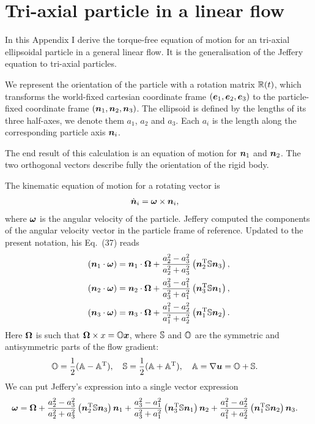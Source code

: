 \documentclass[thesis.tex]{subfiles}
\begin{document}
\chapter{Tri-axial particle in a linear flow}

In this Appendix I derive the torque-free equation of motion for an tri-axial ellipsoidal particle in a general linear flow. It is the generalisation of the Jeffery equation to tri-axial particles. 

We represent the orientation of the particle with a rotation matrix $\mathbb{R}(t)$, which transforms the world-fixed cartesian coordinate frame $(\mbox{\boldmath$e$}_1, \mbox{\boldmath$e$}_2, \mbox{\boldmath$e$}_3)$ to the particle-fixed coordinate frame $(\mbox{\boldmath$n$}_1, \mbox{\boldmath$n$}_2, \mbox{\boldmath$n$}_3)$. The ellipsoid is defined by the lengths of its three half-axes, we denote them $a_1$, $a_2$ and $a_3$. Each $a_i$ is the length along the corresponding particle axis $\mbox{\boldmath$n$}_i$.

The end result of this calculation is an equation of motion for $\mbox{\boldmath$n$}_1$ and $\mbox{\boldmath$n$}_2$. The two orthogonal vectors describe fully the orientation of the rigid body.

The kinematic equation of motion for a rotating vector is 
\begin{align}
	\dot{\ve n}_i &= \ve \omega \cross \ve n_i,\eqnlab{tri01}
\end{align}
where $\mbox{\boldmath$\omega$}$ is the angular velocity of the particle.
Jeffery \cite{jeffery1922} computed the components of the angular velocity vector in the particle frame of reference. Updated to the present notation, his Eq.~(37) reads
\begin{align*}
	(\mbox{\boldmath$n$}_1 \cdot \mbox{\boldmath$\omega$}) &= \mbox{\boldmath$n$}_1\cdot \mbox{\boldmath$\Omega$} + \frac{a_2^2-a_3^2}{a_2^2+a_3^2}\left(\mbox{\boldmath$n$}_2^{\mathrm T} \mathbb{S}\mbox{\boldmath$n$}_3\right),\\
	(\mbox{\boldmath$n$}_2 \cdot \mbox{\boldmath$\omega$}) &= \mbox{\boldmath$n$}_2\cdot \mbox{\boldmath$\Omega$} + \frac{a_3^2-a_1^2}{a_3^2+a_1^2}\left(\mbox{\boldmath$n$}_3^{\mathrm T} \mathbb{S}\mbox{\boldmath$n$}_1\right),\\
	(\mbox{\boldmath$n$}_3 \cdot \mbox{\boldmath$\omega$}) &= \mbox{\boldmath$n$}_3\cdot \mbox{\boldmath$\Omega$} + \frac{a_1^2-a_2^2}{a_1^2+a_2^2}\left(\mbox{\boldmath$n$}_1^{\mathrm T} \mathbb{S}\mbox{\boldmath$n$}_2\right).
\end{align*}
Here $\mbox{\boldmath$\Omega$}$ is such that $\mbox{\boldmath$\Omega$} \times x = \mathbb{O}\mbox{\boldmath$x$}$, where $\mathbb{S}$ and $\mathbb{O}$ are the symmetric and antisymmetric parts of the flow gradient:
\begin{align*}
	&\mathbb{O} = \frac{1}{2}(\mathbb{A} - \mathbb{A}^{\mathrm T}),\quad
	\mathbb{S} = \frac{1}{2}(\mathbb{A} + \mathbb{A}^{\mathrm T}),\quad
	\mathbb{A} = \nabla \mbox{\boldmath$u$} = \mathbb{O} + \mathbb{S}.
\end{align*}
We can put Jeffery's expression into a single vector expression
\begin{align*}
	\mbox{\boldmath$\omega$} &= \mbox{\boldmath$\Omega$}
	 + \frac{a_2^2-a_3^2}{a_2^2+a_3^2}\left(\mbox{\boldmath$n$}_2^{\mathrm T} \mathbb{S}\mbox{\boldmath$n$}_3\right)\mbox{\boldmath$n$}_1
	 + \frac{a_3^2-a_1^2}{a_3^2+a_1^2}\left(\mbox{\boldmath$n$}_3^{\mathrm T} \mathbb{S}\mbox{\boldmath$n$}_1\right)\mbox{\boldmath$n$}_2
	  + \frac{a_1^2-a_2^2}{a_1^2+a_2^2}\left(\mbox{\boldmath$n$}_1^{\mathrm T} \mathbb{S}\mbox{\boldmath$n$}_2\right)\mbox{\boldmath$n$}_3.
\end{align*}
\end{document}
